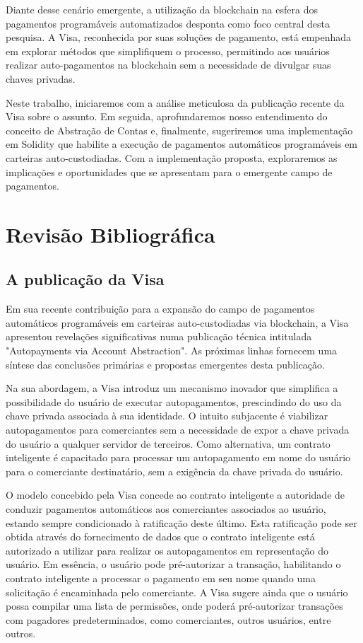 \documentclass[12pt]{article}
\begin{document}
Diante desse cenário emergente, a utilização da blockchain na esfera dos pagamentos programáveis
automatizados desponta como foco central desta pesquisa. A Visa, reconhecida por suas soluções de
pagamento, está empenhada em explorar métodos que simplifiquem o processo, permitindo aos usuários
realizar auto-pagamentos na blockchain sem a necessidade de divulgar suas chaves privadas.

Neste trabalho, iniciaremos com a análise meticulosa da publicação recente da Visa sobre o assunto.
Em seguida, aprofundaremos nosso entendimento do conceito de Abstração de Contas e, finalmente,
sugeriremos uma implementação em Solidity que habilite a execução de pagamentos automáticos
programáveis em carteiras auto-custodiadas. Com a implementação proposta, exploraremos as
implicações e oportunidades que se apresentam para o emergente campo de pagamentos.

\section{Revisão Bibliográfica}\label{sec:revisao}

\subsection{A publicação da Visa}
Em sua recente contribuição para a expansão do campo de pagamentos automáticos programáveis em
carteiras auto-custodiadas via blockchain, a Visa apresentou revelações significativas numa
publicação técnica intitulada "Autopayments via Account Abstraction". As próximas linhas fornecem
uma síntese das conclusões primárias e propostas emergentes desta publicação.

Na sua abordagem, a Visa introduz um mecanismo inovador que simplifica a possibilidade do usuário
de executar autopagamentos, prescindindo do uso da chave privada associada à sua identidade. O
intuito subjacente é viabilizar autopagamentos para comerciantes sem a necessidade de expor a chave
privada do usuário a qualquer servidor de terceiros. Como alternativa, um contrato inteligente é
capacitado para processar um autopagamento em nome do usuário para o comerciante destinatário, sem
a exigência da chave privada do usuário.

O modelo concebido pela Visa concede ao contrato inteligente a autoridade de conduzir pagamentos
automáticos aos comerciantes associados ao usuário, estando sempre condicionado à ratificação deste
último. Esta ratificação pode ser obtida através do fornecimento de dados que o contrato
inteligente está autorizado a utilizar para realizar os autopagamentos em representação do usuário.
Em essência, o usuário pode pré-autorizar a transação, habilitando o contrato inteligente a
processar o pagamento em seu nome quando uma solicitação é encaminhada pelo comerciante. A Visa
sugere ainda que o usuário possa compilar uma lista de permissões, onde poderá pré-autorizar
transações com pagadores predeterminados, como comerciantes, outros usuários, entre outros.
\end{document}
